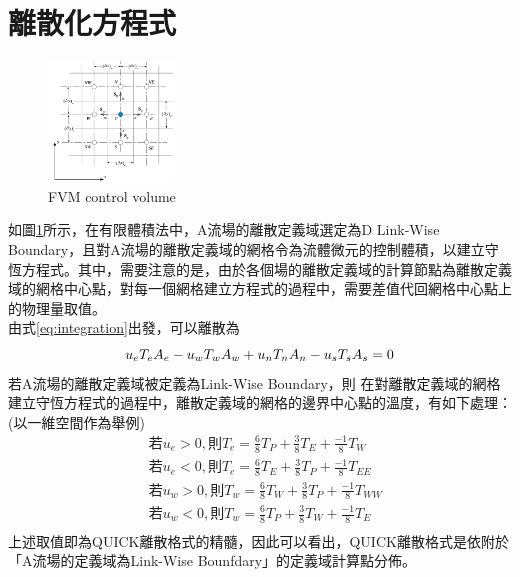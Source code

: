\documentclass[12pt]{article}
\begin{document}
\section{離散化方程式}
\begin{figure}[H]
        \centering
        \includegraphics[width=0.3\textwidth]{12.png}
        \caption{FVM control volume}
        \label{fig:FVM_control_volume}
\end{figure}
\noindent 如圖\ref{fig:FVM_control_volume}所示，在有限體積法中，A流場的離散定義域選定為D Link-Wise Boundary，且對A流場的離散定義域的網格令為流體微元的控制體積，以建立守恆方程式。其中，需要注意的是，由於各個場的離散定義域的計算節點為離散定義域的網格中心點，對每一個網格建立方程式的過程中，需要差值代回網格中心點上的物理量取值。\\
\noindent 由式\eqref{eq:integration}出發，可以離散為
\begin{equation}\label{eq:discreete1}
    u_{e}T_{e}A_{e} - u_{w}T_{w}A_{w} + u_{n}T_{n}A_{n} - u_{s}T_{s}A_{s} = 0 \\
\end{equation}
\noindent 若A流場的離散定義域被定義為Link-Wise Boundary，則 在對離散定義域的網格建立守恆方程式的過程中，離散定義域的網格的邊界中心點的溫度，有如下處理：(以一維空間作為舉例)
\begin{equation}\begin{split}
    &\text{若}u_{e} > 0 , \text{則}T_{e} = \frac{6}{8}T_{P} + \frac{3}{8}T_{E} + \frac{-1}{8}T_{W} \\[1.5ex]
    &\text{若}u_{e} < 0 , \text{則}T_{e} = \frac{6}{8}T_{E} + \frac{3}{8}T_{P} + \frac{-1}{8}T_{EE} \\[1.5ex]
    &\text{若}u_{w} > 0 , \text{則}T_{w} = \frac{6}{8}T_{W} + \frac{3}{8}T_{P} + \frac{-1}{8}T_{WW} \\[1.5ex]
    &\text{若}u_{w} < 0 , \text{則}T_{w} = \frac{6}{8}T_{P} + \frac{3}{8}T_{W} + \frac{-1}{8}T_{E} \\[1.5ex]
\end{split}\end{equation}
上述取值即為QUICK離散格式的精髓，因此可以看出，QUICK離散格式是依附於「A流場的定義域為Link-Wise Bounfdary」的定義域計算點分佈。\\
\end{document}
